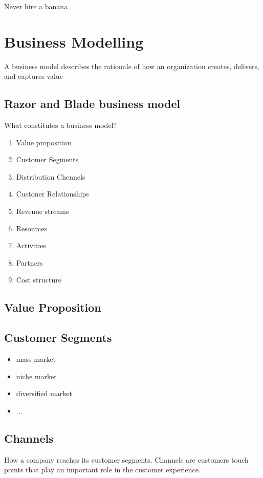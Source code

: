 \documentclass{article}
\begin{document}
\begin{warning}{Never hire a banana}
\end{warning}

\section{Business Modelling}
A business model describes the rationale of how an organization creates, delivers, and captures value
\subsection{Razor and Blade business model}

What constitutes a business model?
\begin{enumerate}
    \item Value proposition
    \item Customer Segments
    \item Distribution Chennels
    \item Custoner Relationships
    \item Revenue streams
    \item Resources
    \item Activities
    \item Partners
    \item Cost structure
\end{enumerate}

\subsection{Value Proposition}
\subsection{Customer Segments}
\begin{itemize}
    \item mass market
    \item niche market
    \item diversified market
    \item ...
\end{itemize}

\subsection{Channels}
How a company reaches its customer segments.
Channels are customers touch points that play an important role in the customer experience.
\end{document}
